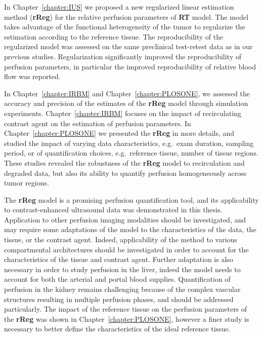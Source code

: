 In Chapter~\ref{chapter:IUS} we proposed a new regularized linear estimation method (\textbf{rReg}) for the relative perfusion parameters of \textbf{RT} model.
The model takes advantage of the functional heterogeneity of the tumor to regularize the estimation according to the reference tissue.
The reproducibility of the regularized model was assessed on the same preclinical test-retest data as in our previous studies.
Regularization significantly improved the reproducibility of perfusion parameters, in particular the improved reproducibility of relative blood flow was reported.

In Chapter~\ref{chapter:IRBM} and Chapter~\ref{chapter:PLOSONE}, we assessed the accuracy and precision of the estimates of the \textbf{rReg} model through simulation experiments.
Chapter~\ref{chapter:IRBM} focuses on the impact of recirculating contrast agent on the estimation of perfusion parameters.
In Chapter~\ref{chapter:PLOSONE} we presented the \textbf{rReg} in more details, and studied the impact of varying data characteristics, e.g.~exam duration, sampling period, or of quantification choices, e.g.~reference tissue, number of tissue regions.
These studies revealed the robustness of the \textbf{rReg} model to recirculation and degraded data, but also its ability to quantify perfusion homogeneously across tumor regions.

The \textbf{rReg} model is a promising perfusion quantification tool, and its applicability to contrast-enhanced ultrasound data was demonstrated in this thesis.
Application to other perfusion imaging modalities should be investigated, and may require some adaptations of the model to the characteristics of the data, the tissue, or the contrast agent.
Indeed, applicability of the method to various compartmental architectures should be investigated in order to account for the characteristics of the tissue and contrast agent.
Further adaptation is also necessary in order to study perfusion in the liver, indeed the model needs to account for both the arterial and portal blood supplies.
Quantification of perfusion in the kidney remains challenging because of the complex vascular structures resulting in multiple perfusion phases, and should be addressed particularly.
The impact of the reference tissue on the perfusion parameters of the \textbf{rReg} was shown in Chapter~\ref{chapter:PLOSONE}, however a finer study is necessary to better define the characteristics of the ideal reference tissue. 



% 
% 